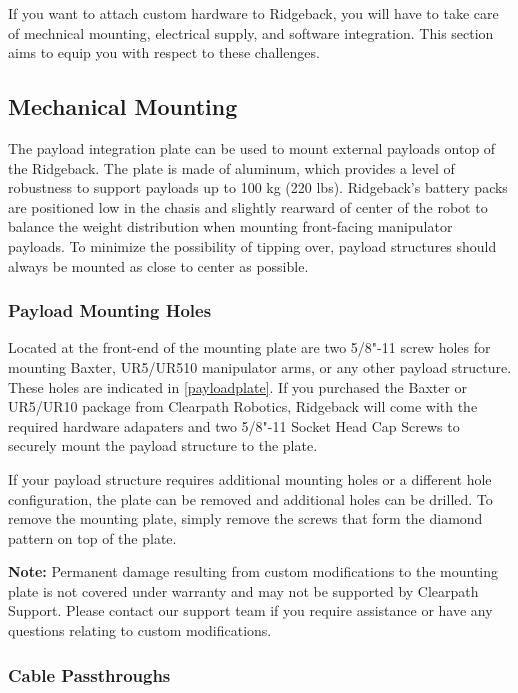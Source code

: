 \documentclass[]{clearpath-latex/clearpath-manual}
\begin{document}
If you want to attach custom hardware to Ridgeback, you will have to take care of mechnical mounting, electrical supply, and software integration.  This section aims to equip you with respect to these challenges.

\subsection{Mechanical Mounting}
\label{mechanical}

The payload integration plate can be used to mount external payloads ontop of the Ridgeback.   The plate is made of aluminum, which provides a level of robustness to support payloads up to 100 kg (220 lbs).   Ridgeback's battery packs are positioned low in the chasis and slightly rearward of center of the robot to balance the weight distribution when mounting front-facing manipulator payloads. To minimize the possibility of tipping over, payload structures should always be mounted as close to center as possible. 

\subsubsection{Payload Mounting Holes}

Located at the front-end of the mounting plate are two 5/8"-11 screw holes for mounting Baxter, UR5/UR510 manipulator arms, or any other payload structure.  These holes are indicated in \autoref{payloadplate}. If you purchased the Baxter or UR5/UR10 package from Clearpath Robotics, Ridgeback will come with the required hardware adapaters and two 5/8"-11 Socket Head Cap Screws to securely mount the payload structure to the plate.  

If your payload structure requires additional mounting holes or a different hole configuration, the plate can be removed and additional holes can be drilled.  To remove the mounting plate, simply remove the screws that form the diamond pattern on top of the plate.   

\textbf{Note:}  Permanent damage resulting from custom modifications to the mounting plate is not covered under warranty and may not be supported by Clearpath Support.  Please contact our support team if you require assistance or have any questions relating to custom modifications.


\subsubsection{Cable Passthroughs}
\end{document}
